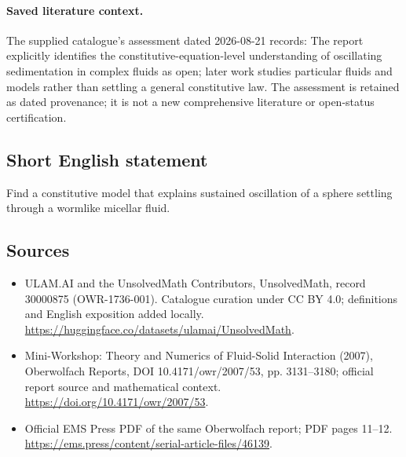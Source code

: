 \documentclass[11pt]{article}
\begin{document}
\paragraph{Saved literature context.} The supplied catalogue's assessment dated 2026-08-21 records: The report explicitly identifies the constitutive-equation-level understanding of oscillating sedimentation in complex fluids as open; later work studies particular fluids and models rather than settling a general constitutive law. The assessment is retained as dated provenance; it is not a new comprehensive literature or open-status certification.
\subsection{Short English statement}
Find a constitutive model that explains sustained oscillation of a sphere settling through a wormlike micellar fluid.
\subsection{Sources}
\begin{itemize}
\item[\hypertarget{source:30000875:1}{S1}] ULAM.AI and the UnsolvedMath Contributors, UnsolvedMath, record 30000875 (OWR-1736-001). Catalogue curation under CC BY 4.0; definitions and English exposition added locally.
\url{https://huggingface.co/datasets/ulamai/UnsolvedMath}.
\item[\hypertarget{source:30000875:2}{S2}] Mini-Workshop: Theory and Numerics of Fluid-Solid Interaction (2007), Oberwolfach Reports, DOI 10.4171/owr/2007/53, pp. 3131--3180; official report source and mathematical context.
\url{https://doi.org/10.4171/owr/2007/53}.
\item[\hypertarget{source:30000875:3}{S3}] Official EMS Press PDF of the same Oberwolfach report; PDF pages 11--12.
\url{https://ems.press/content/serial-article-files/46139}.
\end{itemize}
\label{end:30000875}
\end{document}
